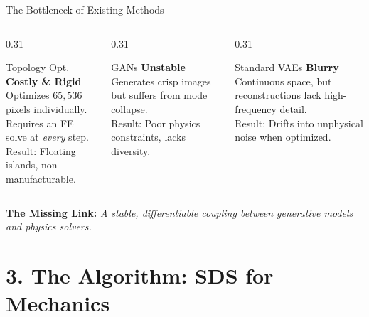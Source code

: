 \documentclass[aspectratio=169, 11pt]{beamer}
\begin{document}
\begin{frame}{The Bottleneck of Existing Methods}
  \begin{columns}
    \begin{column}{0.31\textwidth}
      \begin{block}{Topology Opt.}
        \centering
        \textbf{Costly \& Rigid}\\
        Optimizes $65{,}536$ pixels individually.\\
        Requires an FE solve at \textit{every} step.\\
        \textcolor{alertColor}{Result: Floating islands, non-manufacturable.}
      \end{block}
    \end{column}
    
    \begin{column}{0.31\textwidth}
      \begin{block}{GANs}
        \centering
        \textbf{Unstable}\\
        Generates crisp images but suffers from mode collapse.\\
        \textcolor{alertColor}{Result: Poor physics constraints, lacks diversity.}
      \end{block}
    \end{column}
    
    \begin{column}{0.31\textwidth}
      \begin{block}{Standard VAEs}
        \centering
        \textbf{Blurry}\\
        Continuous space, but reconstructions lack high-frequency detail.\\
        \textcolor{alertColor}{Result: Drifts into unphysical noise when optimized.}
      \end{block}
    \end{column}
  \end{columns}
  
  \vspace{1.5em}
  \begin{center}
    \Large \textbf{The Missing Link:} \textit{A stable, differentiable coupling between generative models and physics solvers.}
  \end{center}
\end{frame}

\section{3. The Algorithm: SDS for Mechanics}
\end{document}
